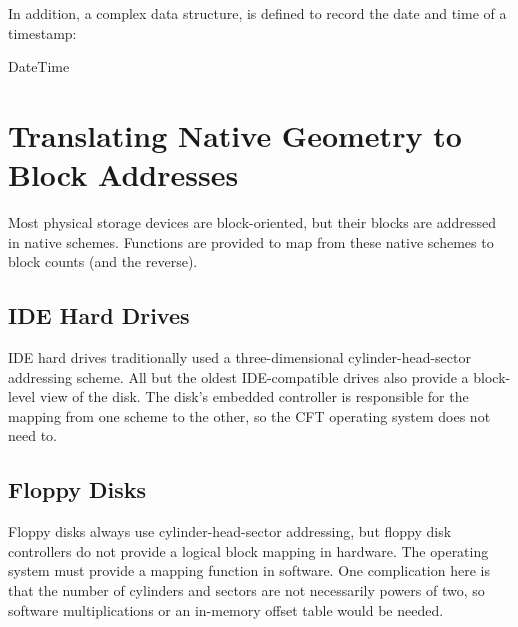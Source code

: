 In addition, a complex data structure,  is defined to record the
date and time of a timestamp:

\begin{datastructure}[Offset]{DateTime}
\end{datastructure}


\section{Translating Native Geometry to Block Addresses}

Most physical storage devices are block-oriented, but their blocks are
addressed in native schemes. Functions are provided to map from these
native schemes to block counts (and the reverse).

\subsection{IDE Hard Drives}

IDE hard drives traditionally used a three-dimensional cylinder-head-sector
addressing scheme. All but the oldest IDE-compatible drives also provide a
block-level view of the disk. The disk's embedded controller is responsible for
the mapping from one scheme to the other, so the CFT operating system does not
need to.

\subsection{Floppy Disks}

Floppy disks always use cylinder-head-sector addressing, but floppy disk
controllers do not provide a logical block mapping in hardware. The operating
system must provide a mapping function in software. One complication here is
that the number of cylinders and sectors are not necessarily powers of two, so
software multiplications or an in-memory offset table would be needed.



